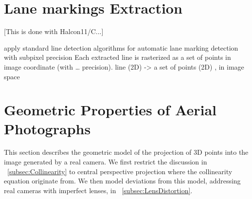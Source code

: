 \section{Lane markings Extraction}
\label{sec:LineExtraction}
[This is done with Halcon11/C...]

apply standard line detection algorithms for automatic lane marking detection
with subpixel precision
Each extracted line is rasterized as a set of points in image coordinate (with … precision).
line (2D) -> a set of points (2D) , in image space






\section{Geometric Properties of Aerial Photographs}
\label{sec:Geometry}

This section describes the geometric model of the projection of 3D points into the image generated by a real camera. We first restrict the discussion in ~\cref{subsec:Collinearity} to central perspective projection where the collinearity equation originate from. We then model deviations from this model, addressing real cameras with imperfect lenses, in ~\cref{subsec:LensDistortion}.

